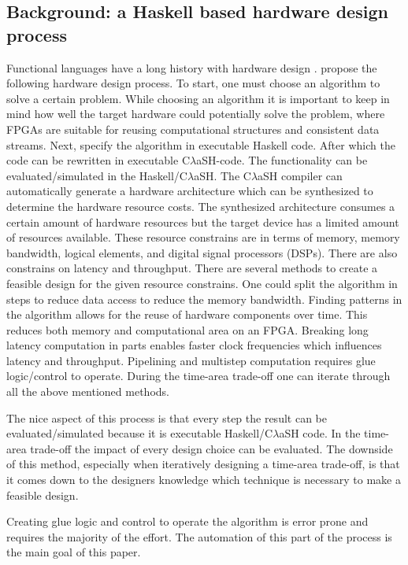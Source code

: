 \documentclass[preprint]{sigplanconf}
\def\clash{C$\lambda$aSH\xspace}
\begin{document}
\subsection{Background: a Haskell based hardware design process}
Functional languages have a long history with hardware design \cite{Sheeran2005}.
\cite{Robin:Hendrik} propose the following hardware design process.
To start, one must choose an algorithm to solve a certain problem.
While choosing an algorithm it is important to keep in mind how well the target hardware could potentially solve the problem, where FPGAs are suitable for reusing computational structures and consistent data streams.
Next, specify the algorithm in executable Haskell code. After which the code can be rewritten in executable \clash -code.
The functionality can be evaluated/simulated in the Haskell/\clash. The \clash compiler can automatically generate a hardware architecture which can be synthesized to determine the hardware resource costs.
The synthesized architecture consumes a certain amount of hardware resources but the target device has a limited amount of resources available.
These resource constrains are in terms of memory, memory bandwidth, logical elements, and digital signal processors (DSPs).
There are also constrains on latency and throughput.
There are several methods to create a feasible design for the given resource constrains.
One could split the algorithm in steps to reduce data access to reduce the memory bandwidth.
Finding patterns in the algorithm allows for the reuse of hardware components over time.
This reduces both memory and computational area on an FPGA.
Breaking long latency computation in parts enables faster clock frequencies which influences latency and throughput.
Pipelining and multistep computation requires glue logic/control to operate.
During the time-area trade-off one can iterate through all the above mentioned methods. 

The nice aspect of this process is that every step the result can be evaluated/simulated because it is executable Haskell/\clash code.
In the time-area trade-off  the impact of every design choice can be evaluated. The downside of this method, especially when iteratively designing a time-area trade-off, is that it comes down to the designers knowledge which technique is necessary to make a feasible design.

Creating glue logic and control to operate the algorithm is error prone and requires the majority of the effort.
The automation of this part of the process is the main goal of this paper.
\end{document}
